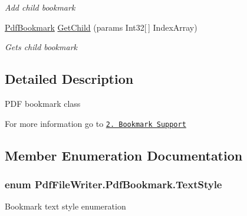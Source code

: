 \begin{DoxyCompactItemize}
\begin{DoxyCompactList}\small\item\em Add child bookmark \end{DoxyCompactList}\item 
\hyperlink{class_pdf_file_writer_1_1_pdf_bookmark}{Pdf\+Bookmark} \hyperlink{class_pdf_file_writer_1_1_pdf_bookmark_a415091e84f7ae24aaea58b0edd0ac679}{Get\+Child} (params Int32\mbox{[}$\,$\mbox{]} Index\+Array)
\begin{DoxyCompactList}\small\item\em Gets child bookmark \end{DoxyCompactList}\end{DoxyCompactItemize}


\subsection{Detailed Description}
P\+DF bookmark class 

For more information go to \href{http://www.codeproject.com/Articles/570682/PDF-File-Writer-Csharp-Class-Library-Version#BookmarkSupport}{\tt 2. Bookmark Support} 

\subsection{Member Enumeration Documentation}
\subsubsection[{\texorpdfstring{Text\+Style}{TextStyle}}]{\setlength{\rightskip}{0pt plus 5cm}enum {\bf Pdf\+File\+Writer.\+Pdf\+Bookmark.\+Text\+Style}\hspace{0.3cm}{\ttfamily [strong]}}\hypertarget{class_pdf_file_writer_1_1_pdf_bookmark_aeeed840fb92fc3e01ed8152a6a8c537c}{}\label{class_pdf_file_writer_1_1_pdf_bookmark_aeeed840fb92fc3e01ed8152a6a8c537c}


Bookmark text style enumeration 

